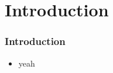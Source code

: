 \section{Introduction}
\begin{frame}\frametitle{Introduction}
	\begin{itemize}
		\item yeah
	\end{itemize}
\end{frame}